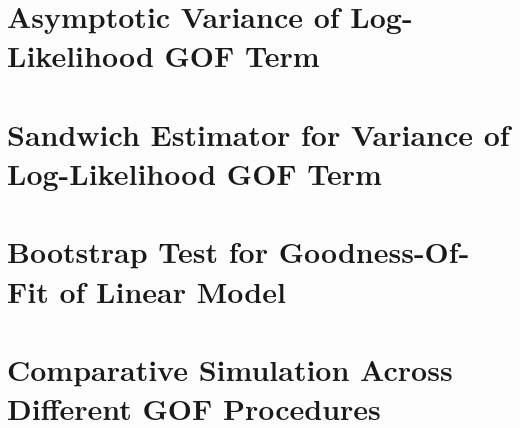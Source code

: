 \doublespace
{}
		
		\section{Asymptotic Variance of Log-Likelihood GOF Term} \label{sec:asymp_var}
		
		\section{Sandwich Estimator for Variance of Log-Likelihood GOF Term} \label{sec:sand_var}
		
		\section{Bootstrap Test for Goodness-Of-Fit of Linear Model} \label{sec:boot_test}

		\section{Comparative Simulation Across Different GOF Procedures} \label{sec:gof_sim}